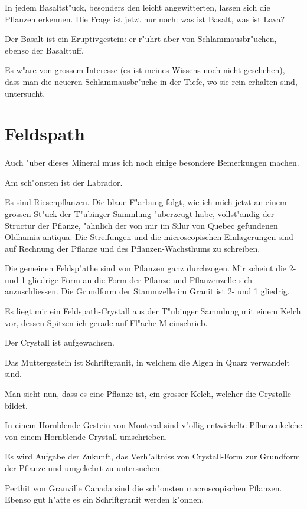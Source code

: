 \documentclass[a4paper, 11pt, oneside, german]{article}
\begin{document}
In jedem Basaltst"uck, besonders den leicht angewitterten, lassen sich die Pflanzen erkennen. Die Frage ist jetzt nur noch: was ist Basalt, was ist Lava?

Der Basalt ist ein Eruptivgestein: er r"uhrt aber von Schlammausbr"uchen, ebenso der Basalttuff.

Es w"are von grossem Interesse (es ist meines Wissens noch nicht geschehen), dass man die neueren Schlammausbr"uche in der Tiefe, wo sie rein erhalten sind, untersucht.
\clearpage
\section{Feldspath}
\paragraph{}
Auch "uber dieses Mineral muss ich noch einige besondere Bemerkungen machen.

Am sch"onsten ist der Labrador.

Es sind Riesenpflanzen. Die blaue F"arbung folgt, wie ich mich jetzt an einem grossen St"uck der T"ubinger Sammlung "uberzeugt habe, vollst"andig der Structur der Pflanze, "ahnlich der von mir im Silur von Quebec gefundenen Oldhamia antiqua. Die Streifungen und die microscopischen Einlagerungen sind auf Rechnung der Pflanze und des Pflanzen-Wachsthums zu schreiben.

Die gemeinen Feldsp"athe sind von Pflanzen ganz durchzogen. Mir scheint die 2- und 1 gliedrige Form an die Form der Pflanze und Pflanzenzelle sich anzuschliessen. Die Grundform der Stammzelle im Granit ist 2- und 1 gliedrig.

Es liegt mir ein Feldspath-Crystall aus der T"ubinger Sammlung mit einem Kelch vor, dessen Spitzen ich gerade auf Fl"ache M einschrieb.

Der Crystall ist aufgewachsen.

Das Muttergestein ist Schriftgranit, in welchem die Algen in Quarz verwandelt sind.

Man sieht nun, dass es eine Pflanze ist, ein grosser Kelch, welcher die Crystalle bildet.

In einem Hornblende-Gestein von Montreal sind v"ollig entwickelte Pflanzenkelche von einem Hornblende-Crystall umschrieben.

Es wird Aufgabe der Zukunft, das Verh"altniss von Crystall-Form zur Grundform der Pflanze und umgekehrt zu untersuchen.

Perthit von Granville Canada sind die sch"onsten macroscopischen Pflanzen. Ebenso gut h"atte es ein Schriftgranit werden k"onnen.
\end{document}
